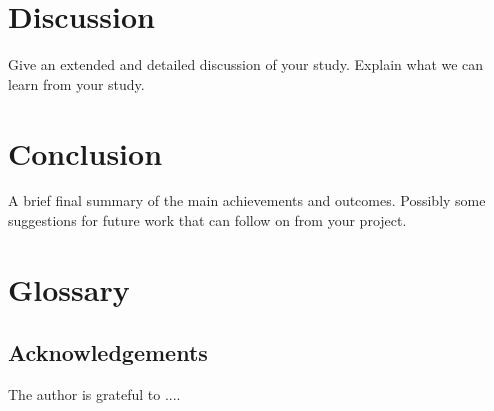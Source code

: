 \documentclass[a4paper,12pt]{article}
\begin{document}
\section{Discussion}
%
Give an extended and detailed discussion of your study. Explain what we can learn from your study.
%

\section{Conclusion}
%
A brief final summary of the main achievements and outcomes. Possibly some suggestions for future work that can follow on from your project.%

\section{Glossary}
%
\subsection*{Acknowledgements}
The author is grateful to ....
%
\vskip 0.2in
\newpage


\end{document}
